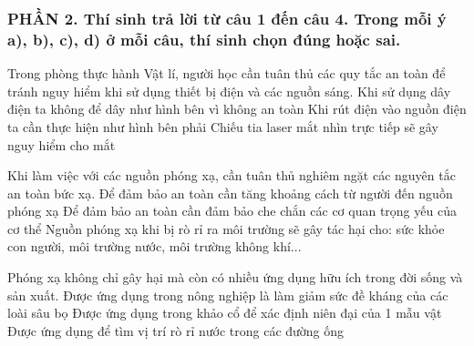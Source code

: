 \subsubsection*{PHẦN 2. Thí sinh trả lời từ câu 1 đến câu 4. Trong mỗi ý a), b), c), d) ở mỗi câu, thí sinh chọn đúng hoặc sai.}
\setcounter{ex}{0}
\begin{ex}%
Trong phòng thực hành Vật lí, người học cần tuân thủ các quy tắc an toàn để tránh nguy hiểm khi sử dụng thiết bị điện và các nguồn sáng.
{\True Khi sử dụng dây điện ta không để dây như hình bên vì không an toàn} 
{Khi rút điện vào nguồn điện ta cần thực hiện như hình bên phải} 
{Chiếu tia laser mắt nhìn trực tiếp sẽ gây nguy hiểm cho mắt} 
\loigiai{ 
\begin{itemchoice}
\itemch
\itemch
\itemch
\itemch
\end{itemchoice}
}
\end{ex}
\begin{ex}%
Khi làm việc với các nguồn phóng xạ, cần tuân thủ nghiêm ngặt các nguyên tắc an toàn bức xạ.
{\True Để đảm bảo an toàn cần tăng khoảng cách từ người đến nguồn phóng xạ} 
{\True Để đảm bảo an toàn cần đảm bảo che chắn các cơ quan trọng yếu của cơ thể} 
{\True Nguồn phóng xạ khi bị rò rỉ ra môi trường sẽ gây tác hại cho: sức khỏe con người, môi trường nước, môi trường không khí...} 
\loigiai{ 
\begin{itemchoice}
\itemch
\itemch
\itemch
\itemch
\end{itemchoice}
}
\end{ex}
\begin{ex}%
Phóng xạ không chỉ gây hại mà còn có nhiều ứng dụng hữu ích trong đời sống và sản xuất.
{Được ứng dụng trong nông nghiệp là làm giảm sức đề kháng của các loài sâu bọ} 
{\True Được ứng dụng trong khảo cổ để xác định niên đại của 1 mẫu vật} 
{\True Được ứng dụng để tìm vị trí rò rỉ nước trong các đường ống} 
\loigiai{ 
\begin{itemchoice}
\itemch
\itemch
\itemch
\itemch
\end{itemchoice}
}
\end{ex}

